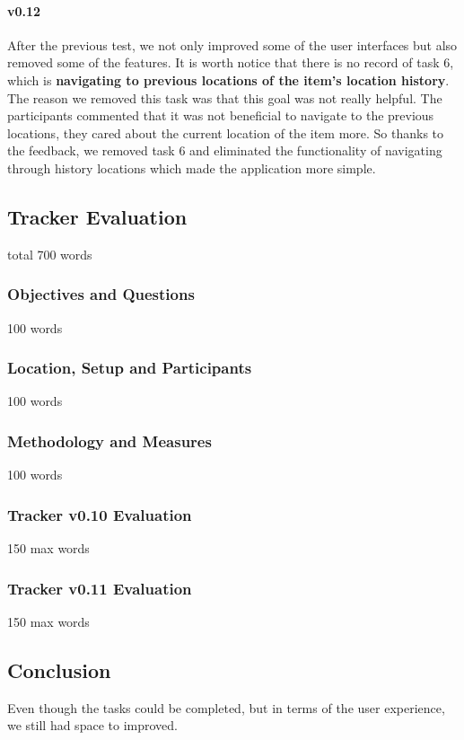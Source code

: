 \documentclass[12pt,a4paper]{article}
\begin{document}
          \paragraph{v0.12} After the previous test, we not only improved some of the user interfaces but also removed some of the features. It is worth notice that there is no record of task 6, which is {\bf navigating to previous locations of the item's location history}. The reason we removed this task was that this goal was not really helpful. The participants commented that it was not beneficial to navigate to the previous locations, they cared about the current location of the item more. So thanks to the feedback, we removed task 6 and eliminated the functionality of navigating through history locations which made the application more simple. 
        
        \subsection{Tracker Evaluation}
            total 700 words
          \subsubsection{Objectives and Questions}
            100 words
          \subsubsection{Location, Setup and Participants}
            100 words
          \subsubsection{Methodology and Measures}
            100 words
          \subsubsection{Tracker v0.10 Evaluation}
            150 max words
          \subsubsection{Tracker v0.11 Evaluation}
            150 max words
        \subsection{Conclusion}
          Even though the tasks could be completed, but in terms of the user experience, we still had space to improved. 
      \newpage
\end{document}
